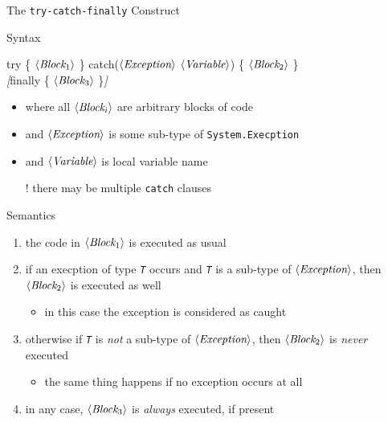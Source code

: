 \documentclass[presentation]{beamer}
\newcommand{\cscat}[1]{$\langle\text{{\itshape#1}}\rangle$}
\newcommand{\csopt}[1]{{\itshape[}#1{\itshape]}}
\begin{document}
\begin{frame}[allowframebreaks]{The \texttt{try-catch-finally} Construct}
  \begin{block}{Syntax}
    \begin{center}\ttfamily
        try \{ \cscat{Block$_1$} \} 
        catch(\cscat{Exception} \cscat{Variable}) \{ \cscat{Block$_2$} \} 
        \\
        \csopt{finally \{ \cscat{Block$_3$} \}}
    \end{center}
    \begin{itemize}
        \item where all \texttt{\cscat{Block$_i$}} are arbitrary blocks of code
        \item and \texttt{\cscat{Exception}} is some sub-type of \texttt{System.Execption}
        \item and \texttt{\cscat{Variable}} is local variable name
        \item[!] there may be multiple \texttt{catch} clauses
    \end{itemize}
  \end{block}

  \begin{block}{Semantics}
    \begin{enumerate}
      \item the code in \texttt{\cscat{Block$_1$}} is executed as usual
      \item if an execption of type \texttt{\textit{T}} occurs and \texttt{\textit{T}} is a sub-type of \texttt{\cscat{Exception}}, then \texttt{\cscat{Block$_2$}} is executed as well
      \begin{itemize}
        \item in this case the exception is considered as \alert{caught}
      \end{itemize}
      \item otherwise if \texttt{\textit{T}} is \emph{not} a sub-type of \texttt{\cscat{Exception}}, then \texttt{\cscat{Block$_2$}} is \emph{never} executed
      \begin{itemize}
        \item the same thing happens if no exception occurs at all
      \end{itemize}
      \item \alert{in any case}, \texttt{\cscat{Block$_3$}} is \emph{always} executed, if present
    \end{enumerate}
  \end{block}


\end{frame}
\end{document}

